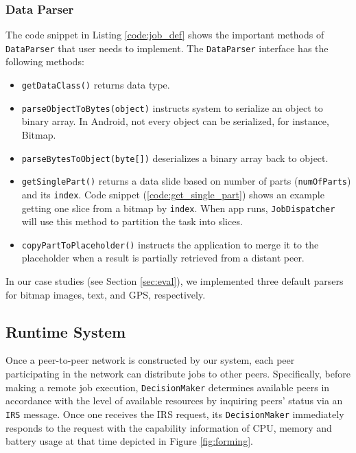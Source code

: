 \documentclass{sig-alternate}[10pt]
\begin{document}
\subsubsection{Data Parser} \label{data_parser}
The code snippet in Listing \ref{code:job_def} shows the important methods of \texttt{DataParser} that user needs to implement. The \texttt{DataParser} interface has the following methods:
\begin{itemize}
	\item \texttt{getDataClass()} returns data type.
	\item \texttt{parseObjectToBytes(object)} instructs system to serialize an object to binary array. In Android, not every object can be serialized, for instance, Bitmap.  
	\item \texttt{parseBytesToObject(byte[])} deserializes a binary array back to object.
	\item \texttt{getSinglePart()} returns a data slide based on number of parts (\texttt{numOfParts}) and its \texttt{index}. Code snippet (\ref{code:get_single_part}) shows an example getting one slice from a bitmap by \texttt{index}. When app runs, \texttt{JobDispatcher} will use this method to partition the task into slices.
	\item \texttt{copyPartToPlaceholder()} instructs the application to merge it to the placeholder when a result is partially retrieved from a distant peer.
\end{itemize}

In our case studies (see Section \ref{sec:eval}), we implemented three default parsers for bitmap images, text, and GPS, respectively. 

\subsection{Runtime System} \label{scheduling}
Once a peer-to-peer network is constructed by our system, each peer participating in the network can distribute jobs to other peers. Specifically, before making a remote job execution, \texttt{DecisionMaker} determines available peers in accordance with the level of available resources by inquiring peers' status via an \texttt{IRS} message. Once one receives the IRS request, its \texttt{DecisionMaker} immediately responds to the request with the capability information of CPU, memory and battery usage at that time depicted in Figure \ref{fig:forming}.

\end{document}
